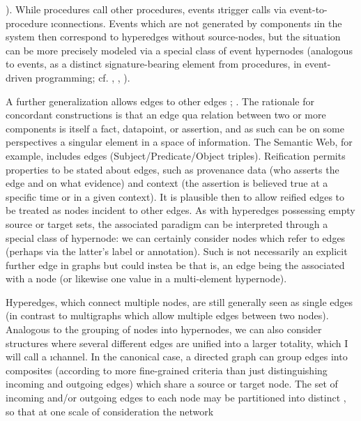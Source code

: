 {\begin{description}
).  While procedures call other procedures, 
events \i{trigger} calls via event-to-procedure 
\i{connections}.   
Events which are not generated by components \i{in} the 
system then correspond to hyperedges without source-nodes, 
but the situation can be more precisely modeled via a 
special class of event hypernodes (analogous to 
events, as a distinct signature-bearing element from 
procedures, in event-driven programming; 
cf. \cite{JenniferPaykin}, 
\cite{PaykinKrishnaswami}, \cite{WolfgangJeltsch}). 
\item[Edges Incident to Edges]  A further generalization 
allows edges to  other edges 
\cite[p. 10]{BalintMolnar}; \cite[p. 13]{BenGoertzel}.
The rationale for concordant constructions is that 
an edge \mdash{} qua relation between two or more 
components \mdash{} is itself a fact, datapoint, or 
assertion, and as such can be on some perspectives a 
singular element in a space of information.  
The Semantic Web, for example, includes  
edges (Subject/Predicate/Object triples).  
Reification permits properties to be stated about edges, 
such as provenance data (who asserts the edge and on 
what evidence) and context (the assertion is believed true 
at a specific time or in a given context).  
It is plausible then to allow reified edges 
to be treated as nodes incident to other edges.  As 
with hyperedges possessing empty source or target 
sets, the associated paradigm can be interpreted through 
a special class of hypernode: we can certainly 
consider nodes which refer to edges (perhaps via the 
latter's label or annotation).  Such  
is not necessarily an explicit further edge in graphs 
but could instea be  \mdash{} that is, an edge being the 
 associated with a node (or likewise  
one value in a multi-element hypernode).
\item[Channels]   Hyperedges, which connect multiple 
nodes, are still generally seen as single edges 
(in contrast to multigraphs which allow multiple 
edges between two nodes).  Analogous to the grouping 
of nodes into hypernodes, we can also consider structures 
where several different edges are unified into a larger 
totality, which I will call a \i{channel}.  
In the canonical case, a directed graph can group 
edges into composites (according to more fine-grained criteria 
than just distinguishing incoming and outgoing edges) which share a 
source or target node.  The set of incoming and/or outgoing  edges 
to each node may be partitioned into distinct 
, so that at one scale of consideration the network 

\end{description}}
